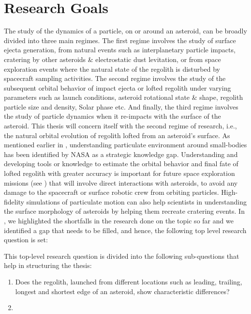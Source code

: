 \chapter{Research Goals}
\label{chap:research_questions}
\graphicspath{{Research_Questions/Images/}}

The study of the dynamics of a particle, on or around an asteroid, can be broadly divided into three main regimes. The first regime involves the study of surface ejecta generation, from natural events such as interplanetary particle impacts, cratering by other asteroids \& electrostatic dust levitation, or from space exploration events where the natural state of the regolith is disturbed by spacecraft sampling activities. The second regime involves the study of the subsequent orbital behavior of impact ejecta or lofted regolith under varying parameters such as launch conditions, asteroid rotational state \& shape, regolith particle size and density, Solar phase etc. And finally, the third regime involves the study of particle dynamics when it re-impacts with the surface of the asteroid. This thesis will concern itself with the second regime of research, i.e., the natural orbital evolution of regolith lofted from an asteroid’s surface.
%
\newline\newline
%
As mentioned earlier in , understanding particulate environment around small-bodies has been identified by \gls{NASA} as a strategic knowledge gap. Understanding and developing tools or knowledge to estimate the orbital behavior and final fate of lofted regolith with greater accuracy is important for future space exploration missions (see ) that will involve direct interactions with asteroids, to avoid any damage to the spacecraft or surface robotic crew from orbiting particles. High-fidelity simulations of particulate motion can also help scientists in understanding the surface morphology of asteroids by helping them recreate cratering events. In , we highlighted the shortfalls in the research done on the topic so far and we identified a gap that needs to be filled, and hence, the following top level research question is set:
\vspace{5mm}
\begin{center}
\end{center}
\vspace{5mm}
This top-level research question is divided into the following sub-questions that help in structuring the thesis:
\begin{enumerate}
\item Does the regolith, launched from different locations such as leading, trailing, longest and shortest edge of an asteroid, show characteristic differences?
\item
\end{enumerate}
